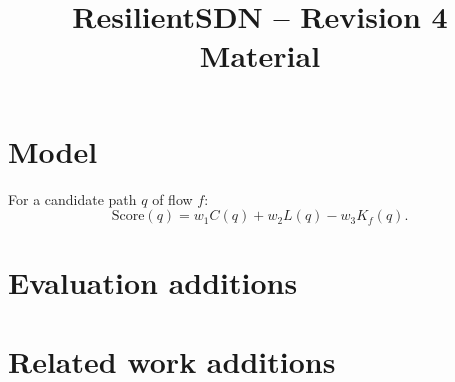 \documentclass[conference]{IEEEtran}
\begin{document}
\title{ResilientSDN -- Revision 4 Material}
\author{}
\maketitle

\section{Model}
For a candidate path $q$ of flow $f$:
\begin{equation}
 \mathrm{Score}(q)=w_1C(q)+w_2L(q)-w_3K_f(q).\label{eq:score}
\end{equation}




\section{Evaluation additions}




\section{Related work additions}




\end{document}
